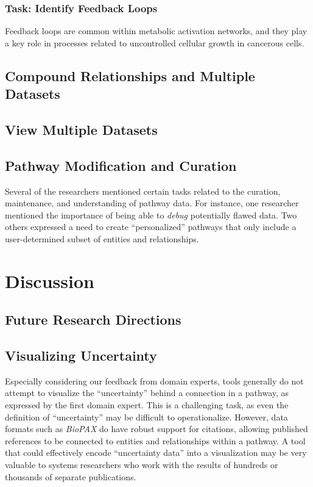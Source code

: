\documentclass{egpubl}
\begin{document}
\subsubsection{Task: Identify Feedback Loops}

Feedback loops are common within metabolic activation networks, and they play a key role in processes related to uncontrolled cellular growth in cancerous cells.

\subsection{Compound Relationships and Multiple Datasets}

\subsection{View Multiple Datasets}

\subsection{Pathway Modification and Curation}

Several of the researchers mentioned certain tasks related to the curation, maintenance, and understanding of pathway data. For instance, one researcher mentioned the importance of being able to \emph{debug} potentially flawed data. Two others expressed a need to create ``personalized'' pathways that only include a user-determined subset of entities and relationships.

\section{Discussion}

\subsection{Future Research Directions}

\subsection{Visualizing Uncertainty}

Especially considering our feedback from domain experts, tools generally do not attempt to visualize the ``uncertainty'' behind a connection in a pathway, as expressed by the first domain expert. This is a challenging task, as even the definition of ``uncertainty'' may be difficult to operationalize. However, data formats such as \emph{BioPAX} do have robust support for citations, allowing published references to be connected to entities and relationships within a pathway. A tool that could effectively encode ``uncertainty data'' into a visualization may be very valuable to systems researchers who work with the results of hundreds or thousands of separate publications.
\end{document}

